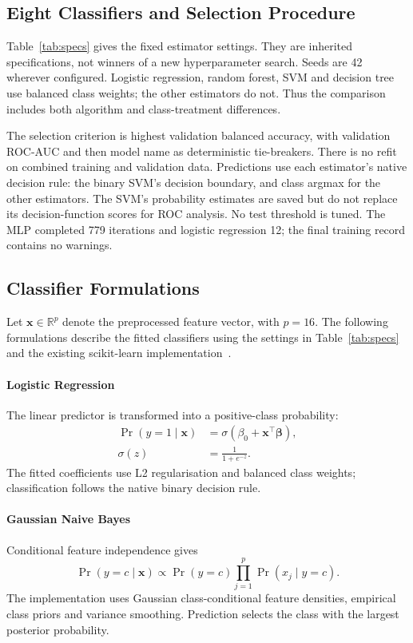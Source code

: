 \documentclass[letterpaper,10pt,conference]{ieeeconf}
\begin{document}
\subsection{Eight Classifiers and Selection Procedure}
Table~\ref{tab:specs} gives the fixed estimator settings. They are inherited specifications, not winners of a new hyperparameter search. Seeds are 42 wherever configured. Logistic regression, random forest, SVM and decision tree use balanced class weights; the other estimators do not. Thus the comparison includes both algorithm and class-treatment differences.


The selection criterion is highest validation balanced accuracy, with validation ROC-AUC and then model name as deterministic tie-breakers. There is no refit on combined training and validation data. Predictions use each estimator's native decision rule: the binary SVM's decision boundary, and class argmax for the other estimators. The SVM's probability estimates are saved but do not replace its decision-function scores for ROC analysis. No test threshold is tuned. The MLP completed 779 iterations and logistic regression 12; the final training record contains no warnings.

\subsection{Classifier Formulations}
Let $\mathbf{x}\in\mathbb{R}^{p}$ denote the preprocessed feature vector, with $p=16$. The following formulations describe the fitted classifiers using the settings in Table~\ref{tab:specs} and the existing scikit-learn implementation~\cite{pedregosa2011}.

\paragraph{Logistic Regression}
The linear predictor is transformed into a positive-class probability:
\begin{equation}
\begin{aligned}
\Pr(y=1\mid\mathbf{x})&=\sigma(\beta_0+\mathbf{x}^{\top}\boldsymbol{\beta}),\\
\sigma(z)&=\frac{1}{1+e^{-z}}.
\end{aligned}
\end{equation}
The fitted coefficients use L2 regularisation and balanced class weights; classification follows the native binary decision rule.

\paragraph{Gaussian Naive Bayes}
Conditional feature independence gives
\begin{equation}
\Pr(y=c\mid\mathbf{x})\propto\Pr(y=c)
\prod_{j=1}^{p}\Pr(x_j\mid y=c).
\end{equation}
The implementation uses Gaussian class-conditional feature densities, empirical class priors and variance smoothing. Prediction selects the class with the largest posterior probability.
\end{document}
